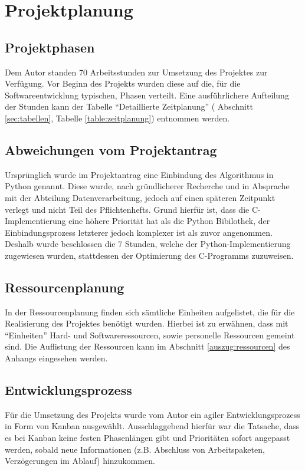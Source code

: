 \section{Projektplanung}
\label{section:projektplanung}
\subsection{Projektphasen}
Dem Autor standen 70 Arbeitsstunden zur Umsetzung des Projektes zur Verfügung.
Vor Beginn des Projekts wurden diese auf die, für die Softwareentwicklung
typischen, Phasen verteilt. Eine ausführlichere Aufteilung der Stunden kann der Tabelle
"`Detaillierte Zeitplanung"' ( Abschnitt \ref{sec:tabellen}, Tabelle \ref{table:zeitplanung}) entnommen werden.



\subsection{Abweichungen vom Projektantrag}
Ursprünglich wurde im Projektantrag eine Einbindung des Algorithmus in
Python genannt. Diese wurde, nach gründlicherer Recherche und in Absprache mit der
Abteilung Datenverarbeitung, jedoch auf einen späteren Zeitpunkt verlegt und nicht
Teil des Pflichtenhefts. Grund hierfür ist, dass die C-Implementierung eine höhere
Priorität hat als die Python Bibilothek, der Einbindungsprozess letzterer jedoch komplexer
ist als zuvor angenommen.
Deshalb wurde beschlossen die 7 Stunden, welche der Python-Implementierung
zugewiesen wurden, stattdessen der Optimierung des C-Programms zuzuweisen.

\subsection{Ressourcenplanung}
In der Ressourcenplanung finden sich sämtliche Einheiten aufgelistet, die für
 die Realisierung des Projektes benötigt wurden. Hierbei ist zu erwähnen, dass mit "`Einheiten"' Hard- und Softwareressourcen, sowie personelle Ressourcen gemeint sind.
 Die Auflistung der Ressourcen kann im Abschnitt \ref{auszug:ressourcen} des Anhangs eingesehen werden.

\subsection{Entwicklungsprozess}
Für die Umsetzung des Projekts wurde vom Autor ein agiler Entwicklungsprozess in
Form von Kanban ausgewählt. Ausschlaggebend hierfür war die Tatsache, dass es bei Kanban
keine festen Phasenlängen gibt und Prioritäten sofort angepasst werden, sobald
neue Informationen (z.B. Abschluss von Arbeitspaketen, Verzögerungen im Ablauf) hinzukommen.\par

